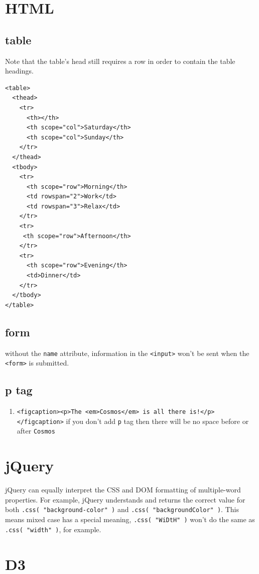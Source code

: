 \documentclass[a4paper, 12pt]{article}
\begin{document}
\section{HTML}
\subsection{table}
Note that the table's head still requires a row in order to contain the table headings.
\begin{verbatim}
<table>
  <thead>
    <tr>
      <th></th>
      <th scope="col">Saturday</th>
      <th scope="col">Sunday</th>
    </tr>
  </thead>
  <tbody>
    <tr>
      <th scope="row">Morning</th>
      <td rowspan="2">Work</td>
      <td rowspan="3">Relax</td>
    </tr>
    <tr>
     <th scope="row">Afternoon</th>
    </tr>
    <tr>
      <th scope="row">Evening</th>
      <td>Dinner</td>
    </tr>
  </tbody>
</table>
\end{verbatim}

\subsection{form}
without the \verb|name| attribute, information in the \verb|<input>| won't be sent when the \verb|<form>| is submitted.

\subsection{p tag}
\begin{enumerate}
\item \verb|<figcaption><p>The <em>Cosmos</em> is all there is!</p></figcaption>| if you don't add \verb|p| tag then there will be no space before or after \verb|Cosmos|
\end{enumerate}


\section{jQuery}
jQuery can equally interpret the CSS and DOM formatting of multiple-word properties. For example, jQuery understands and returns the correct value for both \verb|.css( "background-color" )| and \verb|.css( "backgroundColor" )|. This means mixed case has a special meaning, \verb|.css( "WiDtH" )| won't do the same as \verb|.css( "width" )|, for example.


\section{D3}
\end{document}
